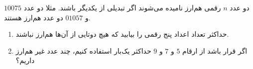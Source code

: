 \EXERCISE
دو عدد
$n$
رقمی هم‌ارز نامیده می‌شوند اگر تبدیلی از یکدیگر باشند. مثلا دو عدد
$10075$
و
$01057$
دو عدد هم‌ارز هستند.
\begin{enumerate}
\item
حداکثر تعداد اعداد پنج رقمی را بیابید که هیچ دوتایی از آن‌ها هم‌ارز نباشند.
\item
اگر قرار باشد از ارقام
$5$
و
$7$
و
$9$
حداکثر یک‌بار استفاده کنیم، چند عدد غیر هم‌ارز داریم؟
\end{enumerate}